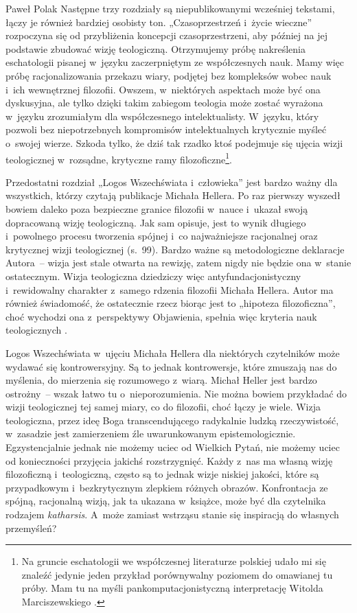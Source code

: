 \begin{recplenv}{Paweł Polak}
Następne trzy rozdziały są niepublikowanymi wcześniej tekstami, łączy je również bardziej osobisty ton.
„Czasoprzestrzeń i~życie wieczne” rozpoczyna się od przybliżenia koncepcji czasoprzestrzeni, aby później na jej
podstawie zbudować wizję teologiczną. Otrzymujemy próbę nakreślenia eschatologii pisanej w~języku zaczerpniętym ze
współczesnych nauk. Mamy więc próbę racjonalizowania przekazu wiary, podjętej bez kompleksów wobec nauk i~ich
wewnętrznej filozofii. Owszem, w~niektórych aspektach może być ona dyskusyjna, ale tylko dzięki takim zabiegom
teologia może zostać wyrażona w~języku zrozumiałym dla współczesnego intelektualisty. W~języku, który pozwoli bez
niepotrzebnych kompromisów intelektualnych krytycznie myśleć o~swojej wierze. Szkoda tylko, że dziś tak rzadko ktoś
podejmuje się ujęcia wizji teologicznej w~rozsądne, krytyczne ramy filozoficzne\footnote{Na gruncie eschatologii we
współczesnej literaturze polskiej udało mi się znaleźć jedynie jeden przykład porównywalny poziomem do omawianej tu
próby. Mam tu na myśli pankomputacjonistyczną interpretację Witolda Marciszewskiego
\parencite*{marciszewski_wszechswiat_1999}.
}.  

Przedostatni rozdział „Logos Wszechświata i~człowieka” jest bardzo ważny dla wszystkich, którzy czytają publikacje
Michała Hellera. Po raz pierwszy wyszedł bowiem daleko poza bezpieczne granice filozofii w~nauce i~ukazał swoją
dopracowaną wizję teologiczną. Jak sam opisuje, jest to wynik długiego i~powolnego procesu tworzenia spójnej i~co
najważniejsze racjonalnej oraz krytycznej wizji teologicznej (s.~99). Bardzo ważne są metodologiczne deklaracje
Autora~-- wizja jest stale otwarta na rewizję, zatem nigdy nie będzie ona w~stanie ostatecznym. Wizja teologiczna dziedziczy
więc antyfundacjonistyczny i~rewidowalny charakter z~samego rdzenia filozofii Michała Hellera. Autor ma również
świadomość, że ostatecznie rzecz biorąc jest to „hipoteza filozoficzna”, choć wychodzi ona z~perspektywy Objawienia,
spełnia więc kryteria nauk teologicznych
\parencite[s.~54]{dzidek_poznanie_2006}.

Logos Wszechświata w~ujęciu Michała Hellera dla niektórych czytelników może wydawać się kontrowersyjny. Są to jednak
kontrowersje, które zmuszają nas do myślenia, do mierzenia się rozumowego z~wiarą. Michał Heller jest bardzo
ostrożny~-- wszak łatwo tu o~nieporozumienia. Nie można bowiem przykładać do wizji teologicznej tej samej miary, co do filozofii,
choć łączy je wiele. Wizja teologiczna, przez ideę Boga transcendującego radykalnie ludzką rzeczywistość, w~zasadzie
jest zamierzeniem źle uwarunkowanym epistemologicznie. Egzystencjalnie jednak nie możemy uciec od Wielkich Pytań, nie
możemy uciec od konieczności przyjęcia jakichś rozstrzygnięć. Każdy z~nas ma własną wizję filozoficzną i~teologiczną,
często są to jednak wizje niskiej jakości, które są przypadkowym i~bezkrytycznym zlepkiem różnych obrazów. Konfrontacja
ze spójną, racjonalną wizją, jak ta ukazana w~książce, może być dla czytelnika rodzajem \textit{katharsis}. A~może zamiast
wstrząsu stanie się inspiracją do własnych przemyśleń?


\end{recplenv}
